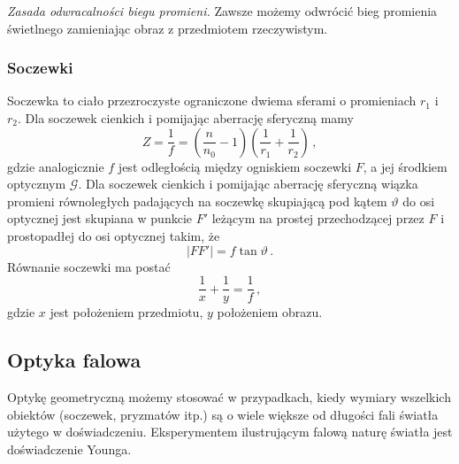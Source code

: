 \documentclass[../main.tex]{subfiles}
\begin{document}
\textit{Zasada odwracalności biegu promieni.} Zawsze możemy odwrócić bieg promienia świetlnego
zamieniając obraz z przedmiotem rzeczywistym.
\subsubsection{Soczewki}
Soczewka to ciało przezroczyste ograniczone dwiema sferami o promieniach \(r_1\) i \(r_2\). Dla
soczewek cienkich i pomijając aberrację sferyczną mamy
\begin{equation*}
    Z=\frac{1}{f}=\left(\frac{n}{n_0}-1\right)\left(\frac{1}{r_1}+\frac{1}{r_2}\right)\,,
\end{equation*}
gdzie analogicznie \(f\) jest odległością między ogniskiem soczewki \(F\), a jej środkiem optycznym
\(\mathcal{G}\). Dla soczewek cienkich i pomijając aberrację sferyczną wiązka promieni równoległych
padających na soczewkę skupiającą pod kątem \(\vartheta\) do osi optycznej jest skupiana w punkcie
\(F'\) leżącym na prostej przechodzącej przez \(F\) i prostopadłej do osi optycznej takim, że
\begin{equation*}
    |FF'|=f\tan\vartheta\,.
\end{equation*}
Równanie soczewki ma postać
\begin{equation*}
    \frac{1}{x}+\frac{1}{y}=\frac{1}{f}\,,
\end{equation*}
gdzie \(x\) jest położeniem przedmiotu, \(y\) położeniem obrazu.

\subsection{Optyka falowa}
Optykę geometryczną możemy stosować w przypadkach, kiedy wymiary wszelkich obiektów (soczewek,
pryzmatów itp.) są o wiele większe od długości fali światła użytego w doświadczeniu. Eksperymentem
ilustrującym falową naturę światła jest doświadczenie Younga.
\end{document}
